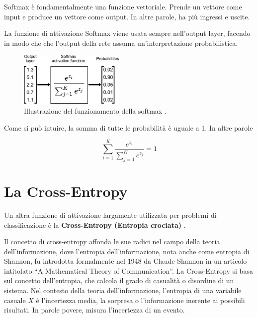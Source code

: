 Softmax è fondamentalmente una funzione vettoriale. Prende un vettore come input e 
produce un vettore come output. In altre parole, ha più ingressi e uscite.

La funzione di attivazione Softmax viene usata sempre nell'output layer, facendo
in modo che che l'output della rete assuma un’interpretazione probabilistica.

\begin{figure}[H]
    \centering
    \includegraphics[width=0.450\textwidth]{Immagini/Generiche/funzionamentoSoftMax.jpg}
    \caption{Illustrazione del funzionamento della softmax \cite{ActivationFunctions_MEDIUM}.}
\end{figure}
\newpage
Come si può intuire, la somma di tutte le probabilità è uguale a 1. In altre
parole

\[
    \sum_{i=1}^{K} \frac{e^{z_i}}{\sum_{j=1}^K e^{z_j}} = 1
\]


\section{La Cross-Entropy}
Un altra funzione di attivazione largamente utilizzata per problemi di 
classificazione è la \textbf{Cross-Entropy (Entropia crociata)}
\cite{GradientDescent_NeuralNetworks,ALL_DEEP_LEARNING}. 

Il concetto di cross-entropy affonda le sue radici nel campo della teoria 
dell'informazione, dove l'entropia dell'informazione, nota anche come entropia 
di Shannon, fu introdotta formalmente nel 1948 da Claude Shannon in un articolo 
intitolato “A Mathematical Theory of Communication”. La Cross-Entropy si basa sul 
concetto dell'entropia, che calcola il grado di casualità o disordine di un sistema. 
Nel contesto della teoria dell'informazione, l'entropia di una variabile casuale $X$
è l'incertezza media, la sorpresa o l'informazione inerente ai possibili risultati. 
In parole povere, misura l'incertezza di un evento.

